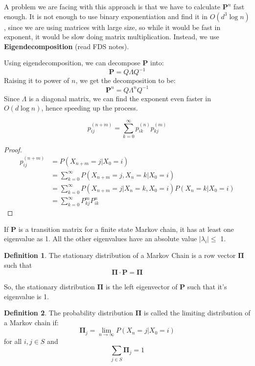 \documentclass[12pt,letterpaper]{book}
\theoremstyle{definition}
\newtheorem{definition}{Definition}%
\begin{document}
A problem we are facing with this approach is that we have to calculate $\mathbf{P}^{n}$ fast enough. It is not enough to use binary exponentiation and find it in $O(d^3\log{n})$, since we are using matrices with large size, so while it would be fast in exponent, it would be slow doing matrix multiplication. Instead, we use \textbf{Eigendecomposition} (read FDS notes).

Using eigendecomposition, we can decompose $\mathbf{P}$ into:
\[\mathbf{P} = Q \Lambda Q^{-1}\]
Raising it to power of $n$, we get the decomposition to be:
\[\mathbf{P}^n = Q \Lambda^n Q^{-1}\]
Since $\Lambda$ is a diagonal matrix, we can find the exponent even faster in $O(d\log n)$, hence speeding up the process.

\begin{theorem}
  \[p_{ij}^{(n+m)} = \sum_{k=0}^{\infty} p_{ik}^{(n)}p_{kj}^{(m)}\]
\end{theorem}
\begin{proof}
  \begin{align*}
    p_{ij}^{(n+m)} &= P(X_{n+m} = j | X_0 = i) \\
                   &= \sum_{k=0}^{\infty} P(X_{n+m} = j, X_n = k | X_0 = i) \\ 
                   &= \sum_{k=0}^{\infty} P(X_{n+m} = j | X_n=k, X_0 = i) P(X_n = k | X_0 =i) \\
                   &= \sum_{k=0}^{\infty} P_{kj}^m P_{ik}^n
  \end{align*}  
\end{proof}

\begin{theorem}
  If $\mathbf{P}$ is a transition matrix for a finite state Markov chain, it has at least one eigenvalue as 1.  All the other eigenvalues have an absolute value $|\lambda_i| \leq$ 1.
\end{theorem}

\begin{definition}
  The stationary distribution of a Markov Chain is a row vector $\mathbf{\Pi}$ such that 
  \[\mathbf{\Pi} \cdot \mathbf{P} = \mathbf{\Pi}\]
\end{definition}

So, the stationary distribution $\mathbf{\Pi}$ is the left eigenvector of $\mathbf{P}$ such that it's eigenvalue is 1.

\begin{definition}
  The probability distribution $\mathbf{\Pi}$ is called the limiting distribution of a Markov chain if:
  \[\mathbf{\Pi}_j = \lim_{n \rightarrow \infty} P(X_n = j | X_0 = i)\]
  for all $i,j \in S$ and 
  \[\sum_{j \in S} \mathbf{\Pi}_j = 1\]
\end{definition}
\end{document}

